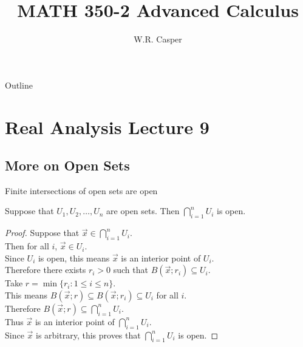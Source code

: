 \documentclass{beamer}
\title{MATH 350-2 Advanced Calculus}
\subtitle
{} %
\author[W.R. Casper] %
{W.R. Casper}
\institute[California State University Fullerton] %
{
  Department of Mathematics\\
  California State University Fullerton}
\begin{document}
\begin{frame}
  \titlepage
\end{frame}

\begin{frame}{Outline}
  \tableofcontents
\end{frame}



\section{Real Analysis Lecture 9}
\subsection{More on Open Sets}

\begin{frame}{Finite intersections of open sets are open}
\begin{thm}
Suppose that $U_1,U_2,\dots,U_n$ are open sets.
Then $\bigcap_{i=1}^n U_i$ is open.
\end{thm}
\pause
\begin{proof}
\pause
Suppose that $\vec x\in \bigcap_{i=1}^n U_i$.\\
\pause
Then for all $i$, $\vec x\in U_i$.\\
\pause
Since $U_i$ is open, this means $\vec x$ is an interior point of $U_i$.\\
\pause
Therefore there exists $r_i>0$ such that $B(\vec x; r_i)\subseteq U_i$.\\
\pause
Take $r = \min\{r_i: 1\leq i \leq n\}$.\\
\pause
This means $B(\vec x; r)\subseteq B(\vec x; r_i)\subseteq U_i$ for all $i$.\\
\pause
Therefore $B(\vec x; r)\subseteq \bigcap_{i=1}^n U_i$.\\
\pause
Thus $\vec x$ is an interior point of $\bigcap_{i=1}^n U_i$.\\
\pause
Since $\vec x$ is arbitrary, this proves that $\bigcap_{i=1}^n U_i$ is open.
\end{proof}
\end{frame}
\end{document}

